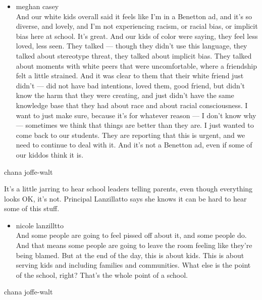 \begin{itemize}
\tightlist
\item
  meghan casey\\
  And our white kids overall said it feels like I'm in a Benetton ad,
  and it's so diverse, and lovely, and I'm not experiencing racism, or
  racial bias, or implicit bias here at school. It's great. And our kids
  of color were saying, they feel less loved, less seen. They talked ---
  though they didn't use this language, they talked about stereotype
  threat, they talked about implicit bias. They talked about moments
  with white peers that were uncomfortable, where a friendship felt a
  little strained. And it was clear to them that their white friend just
  didn't --- did not have bad intentions, loved them, good friend, but
  didn't know the harm that they were creating, and just didn't have the
  same knowledge base that they had about race and about racial
  consciousness. I want to just make sure, because it's for whatever
  reason --- I don't know why --- sometimes we think that things are
  better than they are. I just wanted to come back to our students. They
  are reporting that this is urgent, and we need to continue to deal
  with it. And it's not a Benetton ad, even if some of our kiddos think
  it is.
\end{itemize}

chana joffe-walt

It's a little jarring to hear school leaders telling parents, even
though everything looks OK, it's not. Principal Lanzillatto says she
knows it can be hard to hear some of this stuff.

\begin{itemize}
\tightlist
\item
  nicole lanzilltto\\
  And some people are going to feel pissed off about it, and some people
  do. And that means some people are going to leave the room feeling
  like they're being blamed. But at the end of the day, this is about
  kids. This is about serving kids and including families and
  communities. What else is the point of the school, right? That's the
  whole point of a school.
\end{itemize}

chana joffe-walt

